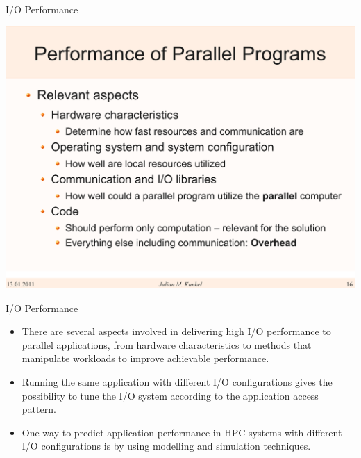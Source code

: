\documentclass[compress,11pt,xcolor=svgnames,aspectratio=169]{beamer}
\begin{document}
\begin{frame}[t]{I/O Performance}

\begin{center}
\includegraphics[scale=0.3]{fig/performance}
\end{center}


\end{frame}

\begin{frame}[t]{I/O Performance}

\begin{itemize}
\setlength\itemsep{0.6cm}

  \item There are several aspects involved in delivering high I/O performance to parallel applications, from hardware characteristics to methods that manipulate workloads to improve achievable performance.

  \item Running the same application with different I/O configurations gives the possibility to tune the I/O system according to the application access pattern.

  \item One way to predict application performance in HPC systems with different I/O configurations is by using modelling and simulation techniques.

\end{itemize}

\end{frame}
\end{document}
